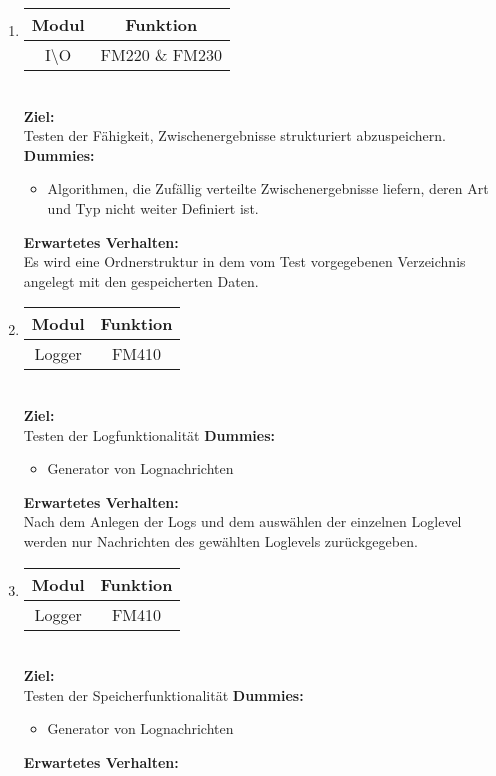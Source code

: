 \begin{enumerate}[align=left, leftmargin=4em, label={\textbf{\textbackslash T2.\arabic*0\textbackslash}} ]
		\item \begin{tabular}{|c|c|}
			\hline Modul & Funktion \\
			\hline I\textbackslash O & FM220 \& FM230 \\
			\hline
		\end{tabular}\\
		\subitem \textbf{Ziel:}\\ Testen der Fähigkeit, Zwischenergebnisse strukturiert abzuspeichern.
		\subitem \textbf{Dummies:} \begin{itemize}
			\item Algorithmen, die Zufällig verteilte Zwischenergebnisse liefern, deren Art und Typ nicht weiter Definiert ist.
		\end{itemize}
		\subitem \textbf{Erwartetes Verhalten:}\\
		Es wird eine Ordnerstruktur in dem vom Test vorgegebenen Verzeichnis angelegt mit den gespeicherten Daten.
		\item \begin{tabular}{|c|c|}
			\hline Modul & Funktion \\
			\hline Logger & FM410 \\
			\hline
		\end{tabular}\\
		\subitem \textbf{Ziel:} \\ Testen der Logfunktionalität
		\subitem \textbf{Dummies:} \begin{itemize}
			\item Generator von Lognachrichten
		\end{itemize}
		\subitem \textbf{Erwartetes Verhalten:}\\
		Nach dem Anlegen der Logs und dem auswählen der einzelnen Loglevel werden nur Nachrichten des gewählten Loglevels zurückgegeben.
		\item \begin{tabular}{|c|c|}
			\hline Modul & Funktion \\
			\hline Logger & FM410 \\
			\hline
		\end{tabular}\\
		\subitem \textbf{Ziel:} \\ Testen der Speicherfunktionalität
		\subitem \textbf{Dummies:} \begin{itemize}
			\item Generator von Lognachrichten
		\end{itemize}
		\subitem \textbf{Erwartetes Verhalten:}\\

\end{enumerate}
